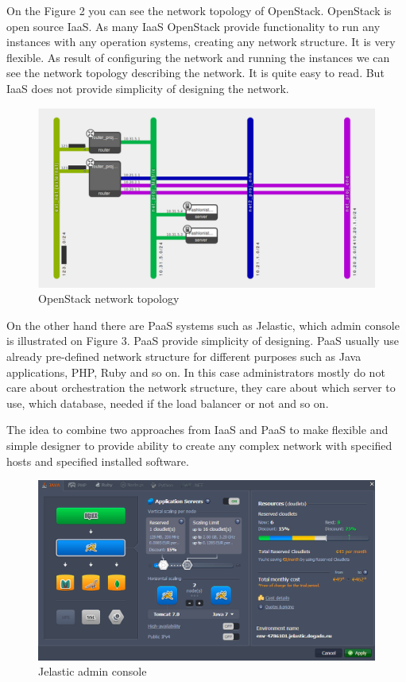 \documentclass[twoside]{article}
\begin{document}
On the Figure 2 you can see the network topology of OpenStack. OpenStack is open source IaaS. As many IaaS OpenStack provide functionality to run any instances with any operation systems, creating any network structure. It is very flexible. As result of configuring the network and running the instances we can see the network topology describing the network.  It is quite easy to read. But IaaS does not provide simplicity of designing the network.     
\begin{figure}[ht!]
\centering
\includegraphics[width=145mm]{openstack_network_topology.png}
\caption{OpenStack network topology}
\label{overflow}
\end{figure}

On the other hand there are PaaS systems such as Jelastic, which admin console is illustrated on Figure 3. PaaS provide simplicity of designing. PaaS usually use already pre-defined network structure for different purposes such as Java applications, PHP, Ruby and so on. In this case administrators mostly do not care about orchestration the network structure, they care about which server to use, which database, needed if the load balancer or not and so on. 

The idea to combine two approaches from IaaS and PaaS to make flexible and simple designer to provide ability to create any complex network with specified hosts and specified installed software. 
     
\begin{figure}[ht!]
\centering
\includegraphics[width=145mm]{jelastic.png}
\caption{Jelastic admin console}
\label{overflow}
\end{figure}
\end{document}
